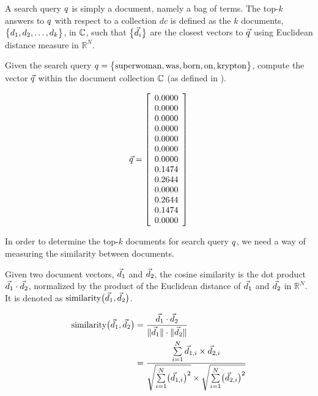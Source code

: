 		\begin{defn}
			A search query $q$ is simply a document, namely a bag of terms.  The top-$k$ answers to $q$ with respect to a collection $dc$ is defined as the $k$ documents, $\bigl\{d_1, d_2, \dotsc, d_k\bigr\}$, in $\mathbb{C}$, such that $\bigl\{\vec{d}_i\bigr\}$ are the closest vectors to $\vec{q}$ using Euclidean distance measure in $\mathbb{R}^N$.
		\end{defn}
		
		\begin{ex}
			Given the search query $q = \bigl\{\mathrm{superwoman}, \mathrm{was}, \mathrm{born}, \mathrm{on}, \mathrm{krypton}\bigr\}$, compute the vector $\vec{q}$ within the document collection $\mathbb{C}$ (as defined in ).
			
			\[
    			\vec{q} = 
    				\left[
    					\begin{array}{c}
    						0.0000 \\
    						0.0000 \\
    						0.0000 \\
    						0.0000 \\
    						0.0000 \\
    						0.0000 \\
    						0.0000 \\
    						0.1474 \\
    						0.2644 \\
    						0.0000 \\
    						0.2644 \\
    						0.1474 \\
    						0.0000 \\
    					\end{array}
    				\right]
			\]
		\end{ex}
		
		In order to determine the top-$k$ documents for search query $q$, we need a way of measuring the similarity between documents.
		
		\begin{defn}
			Given two document vectors, $\vec{d}_1$ and $\vec{d}_2$, the cosine similarity is the dot product $\vec{d}_1 \cdot \vec{d}_2$, normalized by the product of the Euclidean distance of $\vec{d}_1$ and $\vec{d}_2$ in $\mathbb{R}^N$.  It is denoted as $\operatorname{similarity}\bigl(\vec{d}_1, \vec{d}_2\bigr)$.
			
			\begin{align}
				\operatorname{similarity}\bigl(\vec{d}_1, \vec{d}_2\bigr) &= \frac{\vec{d}_1 \cdot \vec{d}_2}{\lVert\vec{d}_1\rVert \cdot \lVert\vec{d}_2\rVert} \\
				 &= \frac{\sum\limits_{i=1}^{N} \vec{d}_{1, i} \times \vec{d}_{2, i}}{\sqrt{\sum\limits_{i=1}^{N} \bigl(\vec{d}_{1, i}\bigr)^2} \times \sqrt{\sum\limits_{i=1}^{N} \bigl(\vec{d}_{2, i}\bigr)^2}}
			\end{align}
		\end{defn}
		
